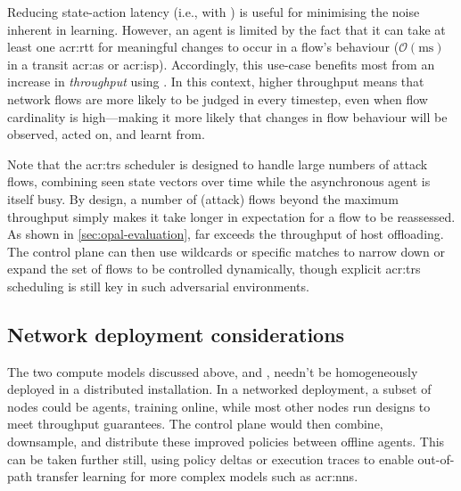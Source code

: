 
Reducing state-action latency (i.e., with \Coopfw) is useful for minimising the noise inherent in learning.
However, an agent is limited by the fact that it can take at least one \gls{acr:rtt} for meaningful changes to occur in a flow's behaviour ($\mathcal{O}{\left(\si{\milli\second}\right)}$ in a transit \gls{acr:as} or \gls{acr:isp}).
Accordingly, this use-case benefits most from an increase in \emph{throughput} using \Indfw{}.
In this context, higher throughput means that network flows are more likely to be judged in every timestep, even when flow cardinality is high---making it more likely that changes in flow behaviour will be observed, acted on, and learnt from.

Note that the \gls{acr:trs} scheduler is designed to handle large numbers of attack flows, combining seen state vectors over time while the asynchronous agent is itself busy.
By design, a number of (attack) flows beyond the maximum throughput simply makes it take longer in expectation for a flow to be reassessed.
As shown in \cref{sec:opal-evaluation}, \approachshort{} far exceeds the throughput of host offloading.
The control plane can then use wildcards or specific matches to narrow down or expand the set of flows to be controlled dynamically, though explicit \gls{acr:trs} scheduling is still key in such adversarial environments.


\subsection{Network deployment considerations}
The two compute models discussed above, \coopfw{} and \indfw{}, needn't be homogeneously deployed in a distributed installation.
In a networked deployment, a subset of \approachshort{} nodes could be \coopfw{} agents, training online, while most other nodes run \indfw{} designs to meet throughput guarantees.
The control plane would then combine, downsample, and distribute these improved policies between offline agents.
This can be taken further still, using policy deltas or execution traces to enable out-of-path transfer learning for more complex models such as \glspl{acr:nn}.